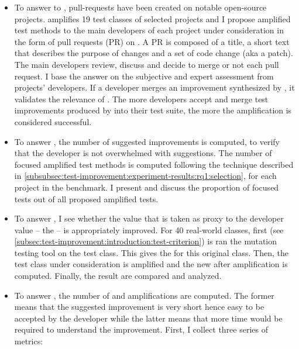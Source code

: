 \begin{itemize}
	\item \textbf{\rqpullrequest}
	To answer to \rqpullrequest, pull-requests have been created on notable open-source projects.
	\dspot amplifies 19 test classes of selected projects and I propose amplified test methods to the main developers of each project under consideration in the form of pull requests (PR) on \gh.
	A PR is composed of a title, a short text that describes the purpose of changes and a set of code change (aka a patch).
	The main developers review, discuss and decide to merge or not each pull request.
	I base the answer on the subjective and expert assessment from projects' developers.
	If a developer merges an improvement synthesized by \dspot, it validates the relevance of \dspot.
	The more developers accept and merge test improvements produced by \dspot into their test suite, the more the amplification is considered successful.
	
	\item \textbf{\rqcandidates}
	To answer \rqcandidates, the number of suggested improvements is computed, to verify that the developer is not overwhelmed with suggestions.
	The number of focused amplified test methods is computed following the technique described in \autoref{subsubsec:test-improvement:experiment-results:rq1:selection}, for each project in the benchmark.
	I present and discuss the proportion of focused tests out of all proposed amplified tests.
	
	\item \textbf{\rqeffectiveness}
	To answer \rqeffectiveness, I see whether the value that is taken as proxy to the developer value -- the \ms -- is appropriately improved.
	For 40 real-world classes, first \pitest (see \autoref{subsec:test-improvement:introduction:test-criterion}) is ran the mutation testing tool on the test class. 
	This gives the \ams for this original class. 
	Then, the test class under consideration is amplified and the new \ams after amplification is computed. 
	Finally, the result are compared and analyzed.
	
	\item \textbf{\rqAmplVersusIAmpl}
	To answer \rqAmplVersusIAmpl, the number of \Aampl and \Iampl amplifications are computed. 
	The former means that the suggested improvement is very short hence easy to be accepted by the developer while the latter means that more time would be required to understand the improvement.
	First, I collect three series of metrics: 
	

\end{itemize}
